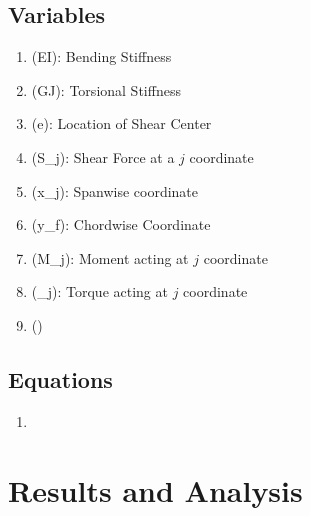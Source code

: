 \documentclass{article}
\begin{document}
\subsection*{Variables}
\begin{enumerate}[label = \roman*.]
    \item (EI): Bending Stiffness
    \item (GJ): Torsional Stiffness
    \item (e): Location of Shear Center
    \item (S_{j}): Shear Force at a $j$ coordinate
    \item (x_{j}): Spanwise coordinate
    \item (y_{f}): Chordwise Coordinate
    \item (M_{j}): Moment acting at $j$ coordinate
    \item (\tau_{j}): Torque acting at $j$ coordinate
    \item ()
\end{enumerate}

\subsection*{Equations}
\begin{enumerate}[label = \Roman*.]
    \item 
\end{enumerate} 


\section{Results and Analysis}
\end{document}
